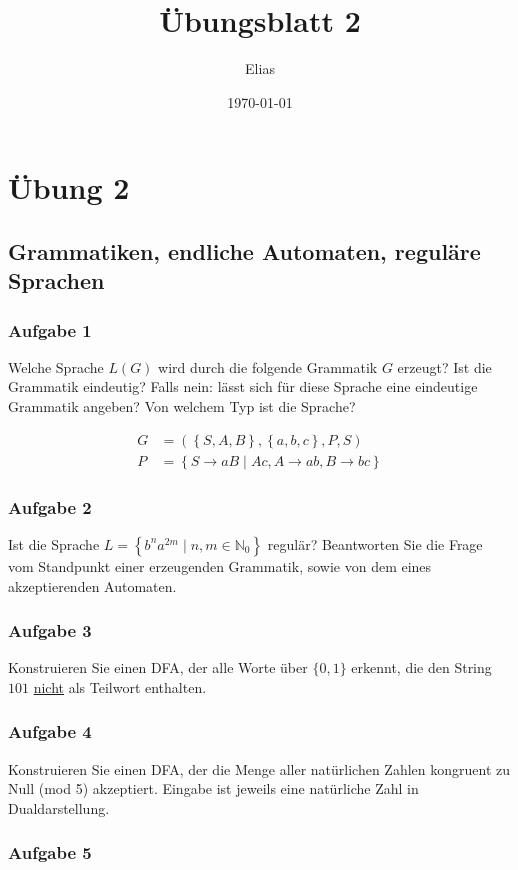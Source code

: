 \documentclass[a4paper,14pt,ngerman]{scrartcl}
\author{Elias}
\date{\today}
\title{Übungsblatt 2}
\begin{document}
\section{\textbf{Übung 2}}
\label{sec:org6f5c327}
\subsection{\textbf{Grammatiken, endliche Automaten, reguläre Sprachen}}
\label{sec:org09a10c1}
\subsubsection{\textbf{Aufgabe 1}}
\label{sec:org80ec6be}

Welche Sprache \(L(G)\) wird durch die folgende Grammatik \(G\) erzeugt?
Ist die Grammatik eindeutig? Falls nein: lässt sich für diese Sprache
eine eindeutige Grammatik angeben? Von welchem Typ ist die Sprache?

\[\begin{aligned}
        G&=\left(\left\{S,A,B\right\},\left\{a,b,c\right\},P,S\right)\\
        P&=\left\{S \rightarrow aB \mid Ac, A \rightarrow ab, B \rightarrow bc\right\} 
\end{aligned}\]
\subsubsection{\textbf{Aufgabe 2}}
\label{sec:org6f69683}

Ist die Sprache
\(L = \left\{b^na^{2m} \mid n,m \in \mathbb{N}_0\right\}\) regulär?
Beantworten Sie die Frage vom Standpunkt einer erzeugenden Grammatik,
sowie von dem eines akzeptierenden Automaten.
\subsubsection{\textbf{Aufgabe 3}}
\label{sec:org7f4aa6b}

Konstruieren Sie einen DFA, der alle Worte über \(\{0,1\}\) erkennt, die
den String \(101\) \uline{nicht} als Teilwort enthalten.
\subsubsection{\textbf{Aufgabe 4}}
\label{sec:org6952c30}

Konstruieren Sie einen DFA, der die Menge aller natürlichen Zahlen
kongruent zu Null (mod 5) akzeptiert. Eingabe ist jeweils eine
natürliche Zahl in Dualdarstellung.
\subsubsection{\textbf{Aufgabe 5}}
\label{sec:org46911f5}
\end{document}
